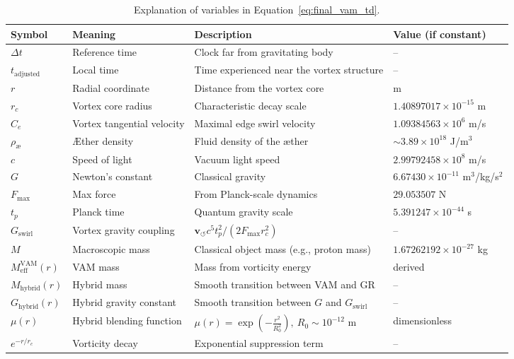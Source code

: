 \documentclass[preprint]{revtex4-2}
\begin{document}
\begin{table}[H]
    \centering
    \footnotesize
    \begin{tabular}{llll}
        \toprule
        \textbf{Symbol} & \textbf{Meaning} & \textbf{Description} & \textbf{Value (if constant)} \\
        \midrule
        $\Delta t$ & Reference time & Clock far from gravitating body & -- \\
        $t_\text{adjusted}$ & Local time & Time experienced near the vortex structure & -- \\
        $r$ & Radial coordinate & Distance from the vortex core & m \\
        $r_c$ & Vortex core radius & Characteristic decay scale & $1.40897017 \times 10^{-15}$ m \\
        $C_e$ & Vortex tangential velocity & Maximal edge swirl velocity & $1.09384563 \times 10^6$ m/s \\
        $\rho_\text{\ae}$ & Æther density & Fluid density of the æther & $\sim 3.89 \times 10^{18}$ J/m$^3$ \\
        $c$ & Speed of light & Vacuum light speed & $2.99792458 \times 10^8$ m/s \\
        $G$ & Newton's constant & Classical gravity & $6.67430 \times 10^{-11}$ m$^3$/kg/s$^2$ \\
        $F_{\text{max}}$ & Max force & From Planck-scale dynamics & $29.053507$ N \\
        $t_p$ & Planck time & Quantum gravity scale & $5.391247 \times 10^{-44}$ s \\
        $G_\text{swirl}$ & Vortex gravity coupling & $\mathbf{v}_{\scriptscriptstyle\boldsymbol{\circlearrowleft}} c^5 t_p^2 / (2 F_{\text{max}} r_c^2)$ & -- \\
        $M$ & Macroscopic mass & Classical object mass (e.g., proton mass) & $1.67262192 \times 10^{-27}$ kg \\
        $M_{\text{eff}}^\text{VAM}(r)$ & VAM mass & Mass from vorticity energy & derived \\
        $M_{\text{hybrid}}(r)$ & Hybrid mass & Smooth transition between VAM and GR & -- \\
        $G_{\text{hybrid}}(r)$ & Hybrid gravity constant & Smooth transition between $G$ and $G_\text{swirl}$ & -- \\
        $\mu(r)$ & Hybrid blending function & $\mu(r) = \exp\left(-\frac{r^2}{R_0^2}\right),\ R_0 \sim 10^{-12}$ m & dimensionless \\
        $e^{-r/r_c}$ & Vorticity decay & Exponential suppression term & -- \\
        \bottomrule
    \end{tabular}
    \caption{Explanation of variables in Equation~\ref{eq:final_vam_td}.}
    \label{tab:time_dilation_variables}
\end{table}
\end{document}

